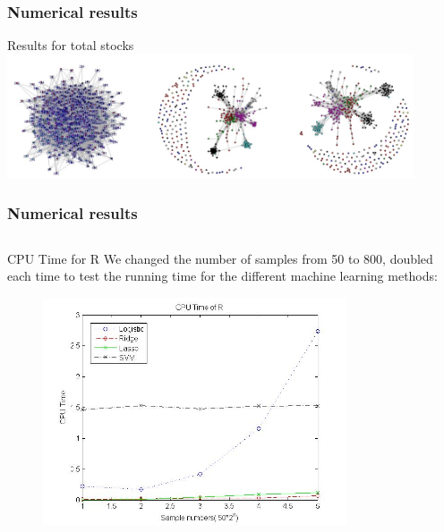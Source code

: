 \documentclass[xcolor={x11names,svgnames,dvipsnames}]{beamer}
\begin{document}
\begin{frame}
\frametitle{Numerical results}
\begin{block}{Results for total stocks}
     \includegraphics[width=0.9\textwidth, height=0.4\textheight]{stock.jpg}
\end{block}
\end{frame}

\begin{frame}
\frametitle{Numerical results}
\begin{columns}
\column{2.3in}
	\begin{block}{CPU Time for R}
We changed the number of samples from 50 to 800, doubled each time to test the running time for the different machine learning methods:\\
\begin{figure}
     \includegraphics[width=0.8\textwidth, height=0.5\textheight]{cputime_r.jpg}

    \end{figure}

\end{block}


\end{columns}
\end{frame}
\end{document}
